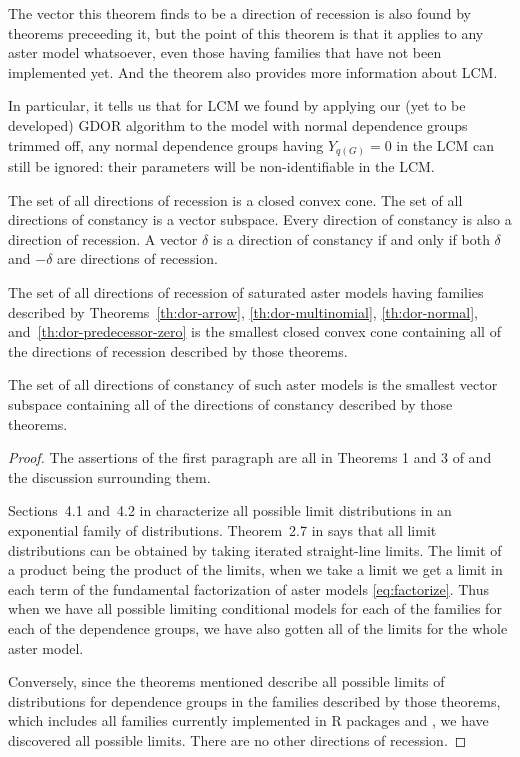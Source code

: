The vector this theorem finds to be a direction of recession is also found
by theorems preceeding it, but the point of this theorem is that it
applies to any aster model whatsoever, even those having families that
have not been implemented yet.  And the theorem also provides more information
about LCM.

In particular, it tells us that for LCM we found by applying our
(yet to be developed) GDOR algorithm to the model with normal dependence
groups trimmed off, any normal dependence groups having $Y_{q(G)} = 0$
in the LCM can still be ignored: their parameters will be non-identifiable
in the LCM.

\begin{theorem} \label{th:dor-aster}
The set of all directions of recession is a closed convex cone.
The set of all directions of constancy is a vector subspace.
Every direction of constancy is also a direction of recession.
A vector $\delta$ is a direction of constancy if and only if
both $\delta$ and $- \delta$ are directions of recession.

The set of all directions of recession of saturated aster models
having families described by Theorems~\ref{th:dor-arrow},
\ref{th:dor-multinomial}, \ref{th:dor-normal},
and~\ref{th:dor-predecessor-zero}
is the smallest closed convex cone containing all of the directions
of recession described by those theorems.

The set of all directions of constancy of such aster models
is the smallest vector subspace containing all of the directions
of constancy described by those theorems.
\end{theorem}
\begin{proof}
The assertions of the first paragraph are all in Theorems 1 and 3 of
\citet{geyer-gdor} and the discussion surrounding them.

Sections~4.1 and~{4.2} in \citet{geyer-thesis} characterize all possible
limit distributions in an exponential family of distributions.
Theorem~{2.7} in \citet{geyer-thesis} says that all limit distributions
can be obtained by taking iterated straight-line limits.
The limit of a product being the product of the limits, when we take a
limit we get a limit in each term of the fundamental factorization of
aster models \eqref{eq:factorize}.
Thus when we have all possible limiting conditional models for each of
the families for each of the dependence groups, we have also gotten
all of the limits for the whole aster model.

Conversely, since the theorems mentioned describe all possible limits
of distributions for dependence groups in the families described by
those theorems, which includes all families currently implemented in
R packages  and , we have discovered all
possible limits.  There are no other directions of recession.
\end{proof}


